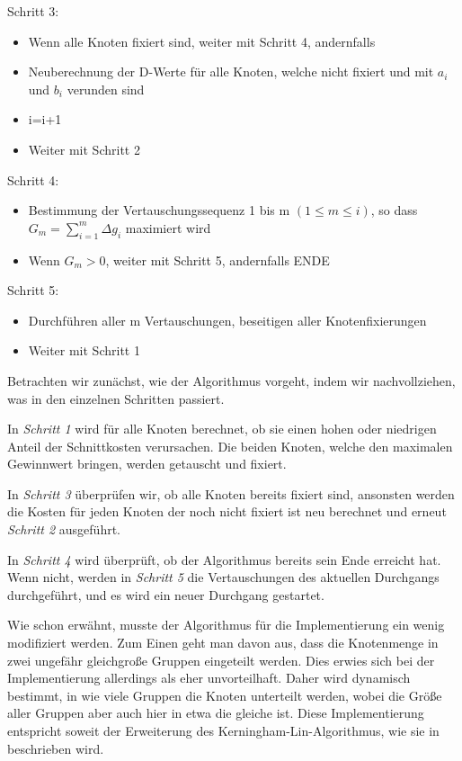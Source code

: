Schritt 3:
\begin{itemize}
  \item Wenn alle Knoten fixiert sind, weiter mit Schritt 4, andernfalls
  \item Neuberechnung der D-Werte für alle Knoten, welche nicht fixiert und
  mit $a_i$ und $b_i$ verunden sind
  \item i=i+1
  \item Weiter mit Schritt 2
\end{itemize}

Schritt 4:
\begin{itemize}
  \item Bestimmung der Vertauschungssequenz 1 bis m $(1 \leq m \leq i)$, so dass
  $G_m = \sum_{i=1}^{m}{\Delta g_i}$ maximiert wird
  \item Wenn $G_m > 0$, weiter mit Schritt 5, andernfalls ENDE
\end{itemize}

Schritt 5:
\begin{itemize}
  \item Durchführen aller m Vertauschungen, beseitigen aller Knotenfixierungen
  \item Weiter mit Schritt 1
\end{itemize}\vspace{10pt}

Betrachten wir zunächst, wie der Algorithmus vorgeht, indem wir
nachvollziehen, was in den einzelnen Schritten passiert.\vspace{10pt}

In \textit{Schritt 1} wird für alle Knoten berechnet, ob sie einen hohen oder
niedrigen Anteil der Schnittkosten verursachen. Die beiden Knoten, welche den
maximalen Gewinnwert bringen, werden getauscht und fixiert.\vspace{10pt}

In \textit{Schritt 3} überprüfen wir, ob alle Knoten bereits fixiert sind,
ansonsten werden die Kosten für jeden Knoten der noch nicht fixiert ist neu
berechnet und erneut
\textit{Schritt 2} ausgeführt.\vspace{10pt}

In \textit{Schritt 4} wird überprüft, ob der Algorithmus bereits sein Ende
erreicht hat. Wenn nicht, werden in \textit{Schritt 5} die Vertauschungen des
aktuellen Durchgangs durchgeführt, und es wird ein neuer Durchgang gestartet.\vspace{10pt}

Wie schon erwähnt, musste der Algorithmus für die Implementierung ein wenig
modifiziert werden. Zum Einen geht man davon aus, dass die
Knotenmenge in zwei ungefähr gleichgroße Gruppen eingeteilt werden. Dies erwies
sich bei der Implementierung allerdings als eher unvorteilhaft. Daher wird dynamisch
bestimmt, in wie viele Gruppen die Knoten unterteilt werden, wobei die Größe
aller Gruppen aber auch hier in etwa die gleiche ist. Diese
Implementierung entspricht soweit der Erweiterung des
Kerningham-Lin-Algorithmus, wie sie in \cite{Layout} beschrieben
wird.\vspace{10pt}

